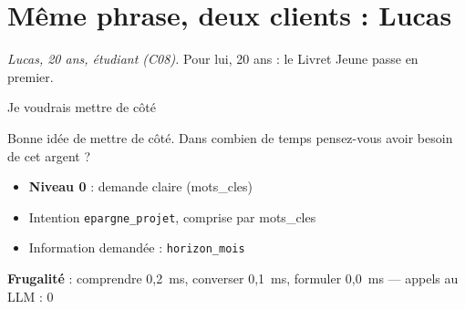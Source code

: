 \documentclass[11pt,a4paper]{article}
\newcommand{\frugal}[1]{{\scriptsize\color{darkgray}\textbf{Frugalité} : #1}\par\medskip}
\begin{document}
\section{Même phrase, deux clients : Lucas}
\textit{Lucas, 20 ans, étudiant (C08).} Pour lui, 20 ans : le Livret Jeune passe en premier.

\begin{client}Je voudrais mettre de côté\end{client}
\begin{assistant}Bonne idée de mettre de côté. Dans combien de temps pensez-vous avoir besoin de cet argent ?\end{assistant}
\begin{pourquoi}
\begin{itemize}
\item \textbf{Niveau 0} : demande claire (mots\_cles)
\item Intention \texttt{epargne\_projet}, comprise par mots\_cles
\item Information demandée : \texttt{horizon\_mois}
\end{itemize}
\end{pourquoi}
\frugal{comprendre 0,2~ms, converser 0,1~ms, formuler 0,0~ms --- appels au LLM : 0}
\end{document}
